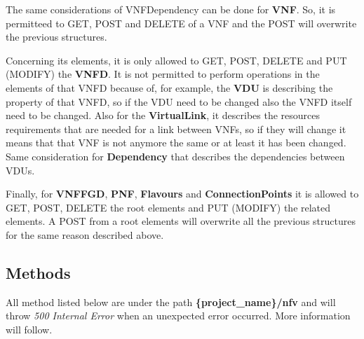 \documentclass[11pt, english]{article}
\begin{document}
The same considerations of VNFDependency can be done for \textbf{VNF}. So, it is permitteed to GET, POST and DELETE of a VNF and the POST will overwrite the previous structures.

Concerning its elements, it is only allowed to GET, POST, DELETE and PUT (MODIFY) the \textbf{VNFD}. It is not permitted to perform operations in the elements of that VNFD because of, for example, the \textbf{VDU} is describing the property of that VNFD, so if the VDU need to be changed also the VNFD itself need to be changed. Also for the \textbf{VirtualLink}, it describes the resources requirements that are needed for a link between VNFs, so if they will change it means that that VNF is not anymore the same or at least it has been changed. Same consideration for \textbf{Dependency} that describes the dependencies between VDUs.

Finally, for \textbf{VNFFGD}, \textbf{PNF}, \textbf{Flavours} and \textbf{ConnectionPoints} it is allowed to GET, POST, DELETE the root elements and PUT (MODIFY) the related elements. A POST from a root elements will overwrite all the previous structures for the same reason described above.

\subsection{Methods}
All method listed below are under the path \textbf{\{project\_name\}/nfv} and will throw \textit{500 Internal Error} when an unexpected error occurred. More information will follow.

\end{document}
